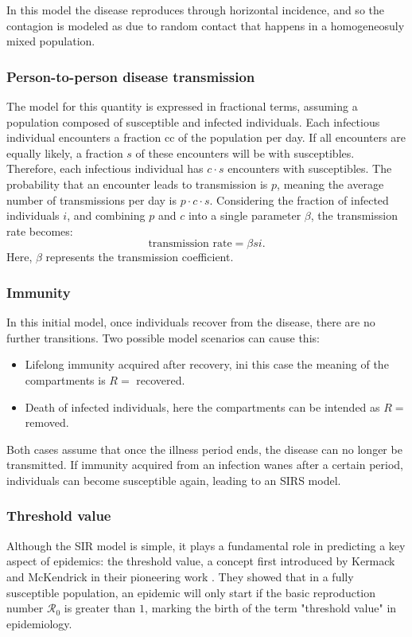 In this model the disease reproduces through horizontal incidence, and so the contagion is modeled as due to random contact that happens in a homogeneosuly mixed population.
\subsubsection{Person-to-person disease transmission}
\label{subsubsec:p2p_transmission}
The model for this quantity is expressed in fractional terms, assuming a population composed of susceptible and infected individuals. Each infectious individual encounters a fraction cc of the population per day. If all encounters are equally likely, a fraction $s$ of these encounters will be with susceptibles. Therefore, each infectious individual has $c\cdot s$ encounters with susceptibles. The probability that an encounter leads to transmission is $p$, meaning the average number of transmissions per day is $p \cdot c \cdot s$. Considering the fraction of infected individuals $i$, and combining $p$ and $c$ into a single parameter $\beta$, the transmission rate becomes:
\[\text{transmission rate} = \beta s i.\]
Here, $\beta$ represents the transmission coefficient.


\subsubsection{Immunity}
In this initial model, once individuals recover from the disease, there are no further transitions. Two possible model scenarios can cause this:
\begin{itemize}
	\item Lifelong immunity acquired after recovery, ini this case the meaning of the compartments is $R =$ recovered.
	\item Death of infected individuals, here the compartments can be intended as $R =$ removed.
\end{itemize}
Both cases assume that once the illness period ends, the disease can no longer be transmitted.
If immunity acquired from an infection wanes after a certain period, individuals can become susceptible again, leading to an SIRS model.

\subsubsection{Threshold value}
\label{subsub:threshold}
Although the SIR model is simple, it plays a fundamental role in predicting a key aspect of epidemics: the threshold value, a concept first introduced by Kermack and McKendrick in their pioneering work \cite{kermack1927}. They showed that in a fully susceptible population, an epidemic will only start if the basic reproduction number $\mathcal{R}_0$ is greater than $1$, marking the birth of the term "threshold value" in epidemiology.

